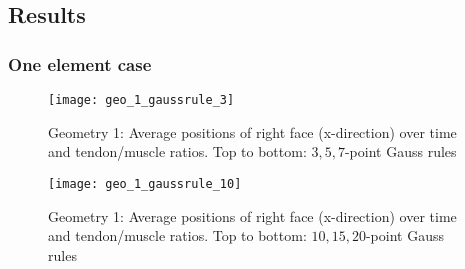 \subsection{Results}
\subsubsection{One element case}
\begin{figure}[!ht]
	\texttt{[image: geo\_1\_gaussrule\_3]}
	\caption{Geometry 1: Average positions of right face (x-direction) over time and tendon/muscle ratios. Top to bottom: $3,5,7$-point Gauss rules}
	\label{fig:geo1_res_pt1}
\end{figure}
\begin{figure}[!ht]
	\texttt{[image: geo\_1\_gaussrule\_10]}
	\caption{Geometry 1: Average positions of right face (x-direction) over time and tendon/muscle ratios. Top to bottom: $10,15,20$-point Gauss rules}
	\label{fig:geo1_res_pt2}
\end{figure}


